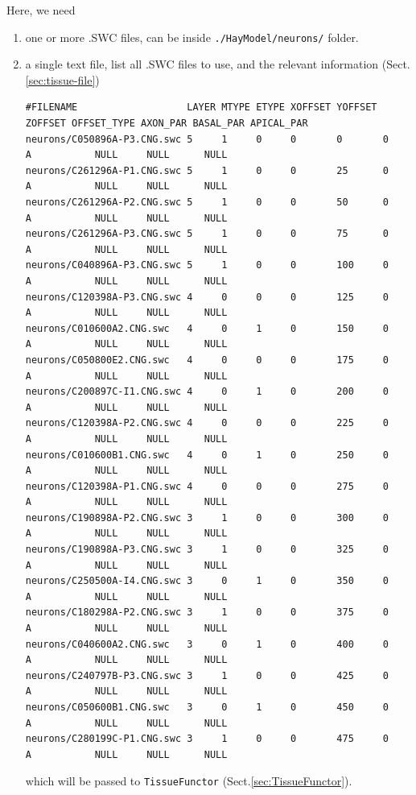 Here, we need
\begin{enumerate}
  \item one or more .SWC files, can be inside \verb!./HayModel/neurons/! folder.
  
  \item a single text file, list all .SWC files to use, and the relevant
  information (Sect.\ref{sec:tissue-file})

{\tiny
\begin{verbatim}
#FILENAME                   LAYER MTYPE ETYPE XOFFSET YOFFSET ZOFFSET OFFSET_TYPE AXON_PAR BASAL_PAR APICAL_PAR
neurons/C050896A-P3.CNG.swc 5     1     0     0       0       0       A           NULL     NULL      NULL
neurons/C261296A-P1.CNG.swc 5     1     0     0       25      0       A           NULL     NULL      NULL
neurons/C261296A-P2.CNG.swc 5     1     0     0       50      0       A           NULL     NULL      NULL
neurons/C261296A-P3.CNG.swc 5     1     0     0       75      0       A           NULL     NULL      NULL
neurons/C040896A-P3.CNG.swc 5     1     0     0       100     0       A           NULL     NULL      NULL
neurons/C120398A-P3.CNG.swc 4     0     0     0       125     0       A           NULL     NULL      NULL
neurons/C010600A2.CNG.swc   4     0     1     0       150     0       A           NULL     NULL      NULL
neurons/C050800E2.CNG.swc   4     0     0     0       175     0       A           NULL     NULL      NULL
neurons/C200897C-I1.CNG.swc 4     0     1     0       200     0       A           NULL     NULL      NULL
neurons/C120398A-P2.CNG.swc 4     0     0     0       225     0       A           NULL     NULL      NULL
neurons/C010600B1.CNG.swc   4     0     1     0       250     0       A           NULL     NULL      NULL
neurons/C120398A-P1.CNG.swc 4     0     0     0       275     0       A           NULL     NULL      NULL
neurons/C190898A-P2.CNG.swc 3     1     0     0       300     0       A           NULL     NULL      NULL
neurons/C190898A-P3.CNG.swc 3     1     0     0       325     0       A           NULL     NULL      NULL
neurons/C250500A-I4.CNG.swc 3     0     1     0       350     0       A           NULL     NULL      NULL
neurons/C180298A-P2.CNG.swc 3     1     0     0       375     0       A           NULL     NULL      NULL
neurons/C040600A2.CNG.swc   3     0     1     0       400     0       A           NULL     NULL      NULL
neurons/C240797B-P3.CNG.swc 3     1     0     0       425     0       A           NULL     NULL      NULL
neurons/C050600B1.CNG.swc   3     0     1     0       450     0       A           NULL     NULL      NULL
neurons/C280199C-P1.CNG.swc 3     1     0     0       475     0       A           NULL     NULL      NULL
\end{verbatim}
}
which will be passed to \verb!TissueFunctor! (Sect.\ref{sec:TissueFunctor}).


  
\end{enumerate}

